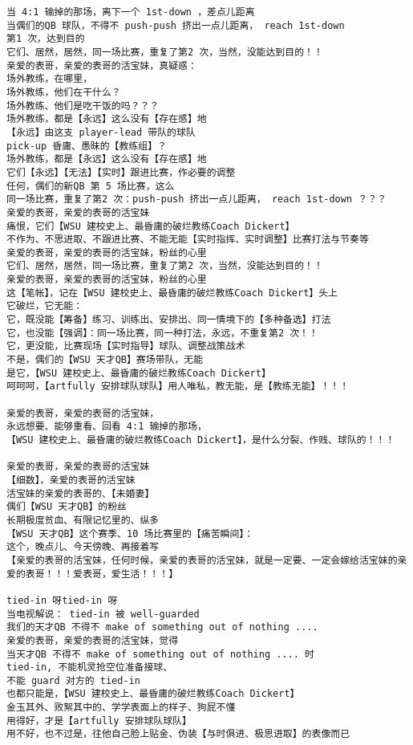 \documentclass[9pt, b5paper]{article}
\begin{document}
\begin{verbatim}
当 4:1 输掉的那场，离下一个 1st-down ，差点儿距离
当偶们的QB 球队，不得不 push-push 挤出一点儿距离， reach 1st-down
第1 次，达到目的
它们、居然，居然，同一场比赛，重复了第2 次，当然，没能达到目的！！
亲爱的表哥，亲爱的表哥的活宝妹，真疑惑：
场外教练，在哪里，
场外教练，他们在干什么？
场外教练、他们是吃干饭的吗？？？
场外教练，都是【永远】这么没有【存在感】地
【永远】由这支 player-lead 带队的球队
pick-up 昏庸、愚昧的【教练组】？
场外教练，都是【永远】这么没有【存在感】地
它们【永远】【无法】【实时】跟进比赛，作必要的调整
任何，偶们的新QB 第 5 场比赛，这么
同一场比赛，重复了第2 次：push-push 挤出一点儿距离， reach 1st-down ？？？
亲爱的表哥，亲爱的表哥的活宝妹
痛恨，它们【WSU 建校史上、最昏庸的破烂教练Coach Dickert】
不作为、不思进取、不跟进比赛、不能无能【实时指挥、实时调整】比赛打法与节奏等
亲爱的表哥，亲爱的表哥的活宝妹，粉丝的心里
它们、居然，居然，同一场比赛，重复了第2 次，当然，没能达到目的！！
亲爱的表哥，亲爱的表哥的活宝妹，粉丝的心里
这【笔帐】，记在【WSU 建校史上、最昏庸的破烂教练Coach Dickert】头上
它破烂，它无能：
它，既没能【筹备】练习、训练出、安排出、同一情境下的【多种备选】打法
它，也没能【强调】：同一场比赛，同一种打法，永远，不重复第2 次！！
它，更没能，比赛现场【实时指导】球队、调整战策战术
不是，偶们的【WSU 天才QB】赛场带队，无能
是它，【WSU 建校史上、最昏庸的破烂教练Coach Dickert】
呵呵呵，【artfully 安排球队球队】用人唯私，教无能，是【教练无能】！！！

亲爱的表哥，亲爱的表哥的活宝妹，
永远想要、能够重看、回看 4:1 输掉的那场，
【WSU 建校史上、最昏庸的破烂教练Coach Dickert】，是什么分裂、作贱、球队的！！！

亲爱的表哥，亲爱的表哥的活宝妹
【细数】，亲爱的表哥的活宝妹
活宝妹的亲爱的表哥的、【未婚妻】
偶们【WSU 天才QB】的粉丝
长期极度贫血、有限记忆里的、纵多
【WSU 天才QB】这个赛季、10 场比赛里的【痛苦瞬间】：
这个，晚点儿、今天傍晚、再接着写
【亲爱的表哥的活宝妹，任何时候，亲爱的表哥的活宝妹，就是一定要、一定会嫁给活宝妹的亲爱的表哥！！！爱表哥，爱生活！！！】

tied-in 呀tied-in 呀
当电视解说： tied-in 被 well-guarded
我们的天才QB 不得不 make of something out of nothing ....
亲爱的表哥，亲爱的表哥的活宝妹，觉得
当天才QB 不得不 make of something out of nothing .... 时
tied-in, 不能机灵抢空位准备接球、
不能 guard 对方的 tied-in
也都只能是，【WSU 建校史上、最昏庸的破烂教练Coach Dickert】
金玉其外、败絮其中的、学学表面上的样子、狗屁不懂
用得好，才是【artfully 安排球队球队】
用不好，也不过是，往他自己脸上贴金、伪装【与时俱进、极思进取】的表像而已


\end{verbatim}
\end{document}

